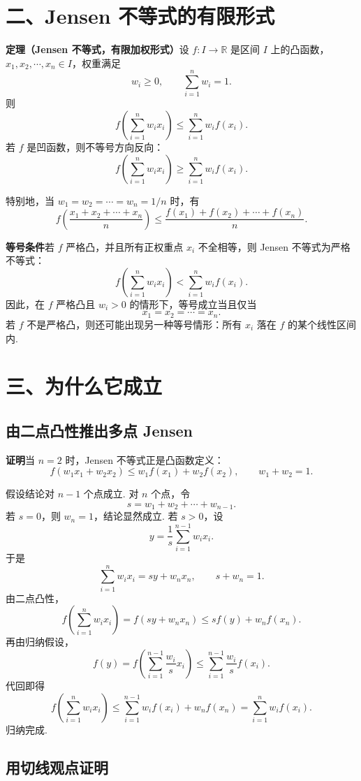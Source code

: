 \documentclass[UTF8, 12pt, fontset=fandol, oneside]{ctexart}
\begin{document}
\section*{二、Jensen 不等式的有限形式}

\noindent\textbf{定理（Jensen 不等式，有限加权形式）}\quad 设 $f:I\to\mathbb R$ 是区间 $I$ 上的凸函数，$x_1,x_2,\cdots,x_n\in I$，权重满足
\[
  w_i\ge0,\qquad \sum_{i=1}^n w_i=1.
\]
则
\[
  f\left(\sum_{i=1}^n w_i x_i\right)
  \le
  \sum_{i=1}^n w_i f(x_i).
\]
若 $f$ 是凹函数，则不等号方向反向：
\[
  f\left(\sum_{i=1}^n w_i x_i\right)
  \ge
  \sum_{i=1}^n w_i f(x_i).
\]

特别地，当 $w_1=w_2=\cdots=w_n=1/n$ 时，有
\[
  f\left(\frac{x_1+x_2+\cdots+x_n}{n}\right)
  \le
  \frac{f(x_1)+f(x_2)+\cdots+f(x_n)}{n}.
\]

\noindent\textbf{等号条件}\quad 若 $f$ 严格凸，并且所有正权重点 $x_i$ 不全相等，则 Jensen 不等式为严格不等式：
\[
  f\left(\sum_{i=1}^n w_i x_i\right)
  <
  \sum_{i=1}^n w_i f(x_i).
\]
因此，在 $f$ 严格凸且 $w_i>0$ 的情形下，等号成立当且仅当
\[
  x_1=x_2=\cdots=x_n.
\]
若 $f$ 不是严格凸，则还可能出现另一种等号情形：所有 $x_i$ 落在 $f$ 的某个线性区间内.

\section*{三、为什么它成立}

\subsection*{由二点凸性推出多点 Jensen}

\noindent\textbf{证明}\quad 当 $n=2$ 时，Jensen 不等式正是凸函数定义：
\[
  f(w_1x_1+w_2x_2)
  \le
  w_1f(x_1)+w_2f(x_2),
  \qquad w_1+w_2=1.
\]

假设结论对 $n-1$ 个点成立. 对 $n$ 个点，令
\[
  s=w_1+w_2+\cdots+w_{n-1}.
\]
若 $s=0$，则 $w_n=1$，结论显然成立. 若 $s>0$，设
\[
  y=\frac{1}{s}\sum_{i=1}^{n-1}w_i x_i.
\]
于是
\[
  \sum_{i=1}^n w_i x_i=sy+w_nx_n,\qquad s+w_n=1.
\]
由二点凸性，
\[
  f\left(\sum_{i=1}^n w_i x_i\right)
  =f(sy+w_nx_n)
  \le
  sf(y)+w_nf(x_n).
\]
再由归纳假设，
\[
  f(y)
  =
  f\left(\sum_{i=1}^{n-1}\frac{w_i}{s}x_i\right)
  \le
  \sum_{i=1}^{n-1}\frac{w_i}{s}f(x_i).
\]
代回即得
\[
  f\left(\sum_{i=1}^n w_i x_i\right)
  \le
  \sum_{i=1}^{n-1}w_if(x_i)+w_nf(x_n)
  =
  \sum_{i=1}^n w_if(x_i).
\]
归纳完成.

\subsection*{用切线观点证明}
\end{document}
